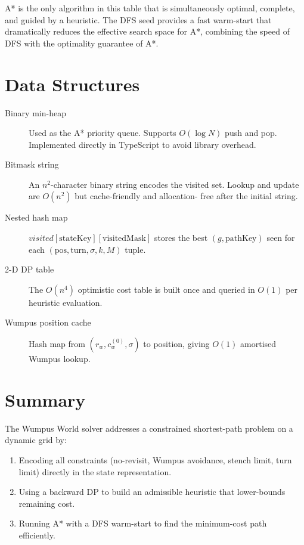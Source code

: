 \documentclass[12pt,a4paper]{article}
\begin{document}
A* is the only algorithm in this table that is simultaneously optimal,
complete, and guided by a heuristic.  The DFS seed provides a fast warm-start
that dramatically reduces the effective search space for A*, combining the
speed of DFS with the optimality guarantee of A*.

\section{Data Structures}

\begin{description}
  \item[Binary min-heap] Used as the A* priority queue.  Supports
        $O(\log N)$ push and pop.  Implemented directly in TypeScript to avoid
        library overhead.
  \item[Bitmask string] An $n^2$-character binary string encodes the visited
        set.  Lookup and update are $O(n^2)$ but cache-friendly and allocation-
        free after the initial string.
  \item[Nested hash map] $\textit{visited}[\text{stateKey}][\text{visitedMask}]$
        stores the best $(g, \text{pathKey})$ seen for each
        $(\text{pos}, \text{turn}, \sigma, k, M)$ tuple.
  \item[2-D DP table] The $O(n^4)$ optimistic cost table is built once and
        queried in $O(1)$ per heuristic evaluation.
  \item[Wumpus position cache] Hash map from $(r_w, c_w^{(0)}, \sigma)$ to
        position, giving $O(1)$ amortised Wumpus lookup.
\end{description}

\section{Summary}

The Wumpus World solver addresses a constrained shortest-path problem on a
dynamic grid by:

\begin{enumerate}
  \item Encoding all constraints (no-revisit, Wumpus avoidance, stench limit,
        turn limit) directly in the state representation.
  \item Using a backward DP to build an admissible heuristic that lower-bounds
        remaining cost.
  \item Running A* with a DFS warm-start to find the minimum-cost path
        efficiently.
\end{enumerate}
\end{document}
